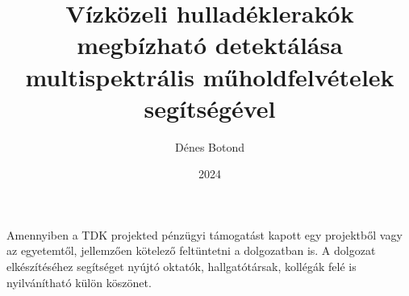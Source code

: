 \documentclass[
]{elteiktdk}[2023/04/10]
\title{Vízközeli hulladéklerakók megbízható detektálása multispektrális műholdfelvételek segítségével}
\date{2024}
\author{Dénes Botond}
\affiliation{egyetemi tanársegéd}
\begin{document}


\makecover
\cleardoublepage
\maketitle

\tableofcontents
\cleardoublepage


\cleardoublepage


\cleardoublepage


\cleardoublepage




\cleardoublepage


\cleardoublepage

\chapter*{\acklabel}
Amennyiben a TDK projekted pénzügyi támogatást kapott egy projektből vagy az egyetemtől, jellemzően kötelező feltüntetni a dolgozatban is. A dolgozat elkészítéséhez segítséget nyújtó oktatók, hallgatótársak, kollégák felé is nyilvánítható külön köszönet.

\appendix

\cleardoublepage

{}
\printbibliography[title=\biblabel]
\cleardoublepage

{}
\listoffigures
\cleardoublepage

{}
\listoftables
\cleardoublepage

{}
\listofalgorithms
\cleardoublepage

{}
\lstlistoflistings
\cleardoublepage

\end{document}
